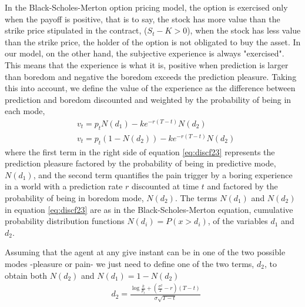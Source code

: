 \documentclass[11pt, onecolumn]{article}
\begin{document}
In the Black-Scholes-Merton option pricing model, the option is exercised only when the payoff is positive, that is to say, the stock  has more value than the strike price stipulated in the contract, ($S_t - K >0 $), when the stock has less value than the strike price, the holder of the option is not obligated to buy the asset. In our model, on the other hand, the subjective experience is always "exercised". This means that the experience is what it is, positive when prediction is larger than boredom and negative the boredom exceeds the prediction pleasure. Taking this into account, we define the value of the experience as the difference between prediction and boredom discounted and weighted by the probability of being in each mode,
\begin{equation}
\begin{split}
   &  v_t  =  p_{t}N(d_1) - k e^{-r(T-t)}N(d_2) \\ 
   &  v_t  =  p_{t}(1 - N(d_2)) - k e^{-r(T-t)}N(d_2) 
\end{split}
\label{eq:discf23}
\end{equation}
where the first term in the right side of equation \ref{eq:discf23} represents the prediction pleasure  factored by the probability of being in predictive mode, $N(d_1)$, and the second term quantifies the pain trigger by a boring experience in a world with a prediction rate $r$ discounted at time $t$ and factored by the probability of being in boredom mode, $N(d_2)$. The terms $N(d_1)$ and $N(d_2)$ in equation \ref{eq:discf23} are as in the Black-Scholes-Merton equation, cumulative probability distribution functions $N(d_i) = P(x > d_i)$, of the variables $d_1$ and $d_2$.  

Assuming that the agent at any give instant can be in one of the two possible modes -pleasure or pain- we just need to define one of the two terms, $d_2$, to obtain both $N(d_2)$ and $N(d_1) = 1 - N(d_2)$
\begin{equation}
\begin{split}
    & d_2 = \frac{\log \frac{k}{p_t}  + (\frac{\sigma ^2}{2} - r)(T-t)}{\sigma \sqrt{T-t}} 
\end{split}
\label{eq:discd1d2}
\end{equation}
\end{document}
